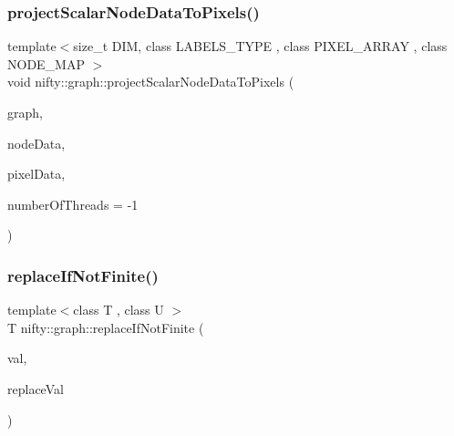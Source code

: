 \subsubsection{\texorpdfstring{project\+Scalar\+Node\+Data\+To\+Pixels()}{projectScalarNodeDataToPixels()}}
{\footnotesize\ttfamily template$<$size\+\_\+t D\+IM, class L\+A\+B\+E\+L\+S\+\_\+\+T\+Y\+PE , class P\+I\+X\+E\+L\+\_\+\+A\+R\+R\+AY , class N\+O\+D\+E\+\_\+\+M\+AP $>$ \\
void nifty\+::graph\+::project\+Scalar\+Node\+Data\+To\+Pixels (\begin{DoxyParamCaption}\item[{const \hyperlink{namespacenifty_1_1graph_a45cca2dcd061996d13ec8e6bb8afb200}{Explicit\+Labels\+Grid\+Rag}$<$ D\+IM, L\+A\+B\+E\+L\+S\+\_\+\+T\+Y\+PE $>$ \&}]{graph,  }\item[{N\+O\+D\+E\+\_\+\+M\+AP \&}]{node\+Data,  }\item[{P\+I\+X\+E\+L\+\_\+\+A\+R\+R\+AY \&}]{pixel\+Data,  }\item[{const int}]{number\+Of\+Threads = {\ttfamily -\/1} }\end{DoxyParamCaption})}

\mbox{\label{namespacenifty_1_1graph_a511023b23336eb0591905cc2034b00a5}} 
\subsubsection{\texorpdfstring{replace\+If\+Not\+Finite()}{replaceIfNotFinite()}}
{\footnotesize\ttfamily template$<$class T , class U $>$ \\
T nifty\+::graph\+::replace\+If\+Not\+Finite (\begin{DoxyParamCaption}\item[{const T \&}]{val,  }\item[{const U \&}]{replace\+Val }\end{DoxyParamCaption})\hspace{0.3cm}{\ttfamily [inline]}}

